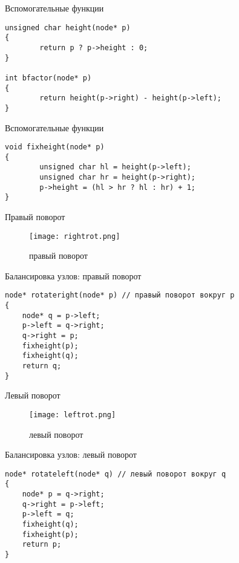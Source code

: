 \documentclass{beamer}
\begin{document}
\begin{frame}[fragile]{Вспомогательные функции}
    \begin{verbatim}
unsigned char height(node* p)
{
        return p ? p->height : 0;
}

int bfactor(node* p)
{
	    return height(p->right) - height(p->left);
}
    \end{verbatim}
\end{frame}

\begin{frame}[fragile]{Вспомогательные функции}
    \begin{verbatim}
void fixheight(node* p)
{
	    unsigned char hl = height(p->left);
	    unsigned char hr = height(p->right);
	    p->height = (hl > hr ? hl : hr) + 1;
}
\end{verbatim}
\end{frame}

\begin{frame}{Правый поворот}
    \begin{figure}
        \texttt{[image: rightrot.png]}
        \caption{правый поворот}
    \end{figure}
\end{frame}

\begin{frame}[fragile]{Балансировка узлов: правый поворот}
    \begin{verbatim}
node* rotateright(node* p) // правый поворот вокруг p
{
    node* q = p->left;
    p->left = q->right;
    q->right = p;
    fixheight(p);
    fixheight(q);
    return q;
}
    \end{verbatim}
\end{frame}

\begin{frame}{Левый поворот}
    \begin{figure}
        \texttt{[image: leftrot.png]}
        \caption{левый поворот}
    \end{figure}
\end{frame}

\begin{frame}[fragile]{Балансировка узлов: левый поворот}
    \begin{verbatim}
node* rotateleft(node* q) // левый поворот вокруг q
{
    node* p = q->right;
    q->right = p->left;
    p->left = q;
    fixheight(q);
    fixheight(p);
    return p;
}
    \end{verbatim}
\end{frame}
\end{document}
